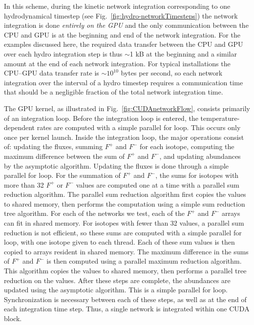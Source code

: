 \documentclass[]{elsart}
\newcommand{\fig}[1]{Fig.~\ref{fig:#1}}
\begin{document}
In this scheme, during the kinetic network integration corresponding to one hydrodynamical
timestep (see \fig{hydro-networkTimesteps}) the network integration is done {\em entirely
on the GPU} and the only communication between the CPU and GPU is at the beginning and end
of the network integration. For the examples discussed here, the required data transfer
between the CPU and GPU over each hydro integration step is thus $\sim$1 kB at the
beginning and a similar amount at the end of each network integration. For typical
installations the CPU--GPU data transfer rate is $\sim 10^{10}$ bytes per
second, so each network integration over the interval of a hydro timestep requires a 
communication time that should be a negligible fraction of the total network
integration time.

The GPU kernel, as illustrated in \fig{CUDAnetworkFlow}, consists primarily of an
integration loop.  Before the integration loop is entered, the temperature-dependent rates
are computed with a simple parallel for loop.  This occurs only once per kernel launch.
Inside the integration loop, the major operations consist of: updating the fluxes,
summing $F^{+}$ and $F^{-}$ for each isotope, computing the maximum difference between
the sum of $F^{+}$ and $F^{-}$, and updating abundances by the asymptotic algorithm.
Updating the fluxes is done through a simple parallel for loop.  For the summation of
$F^{+}$ and $F^{-}$, the sums for isotopes with more than 32 $F^{+}$ or $F^{-}$ values are
computed one at a time with a parallel sum reduction algorithm.  The parallel sum reduction algorithm first
copies the values to shared memory, then performs the computation using
a simple sum reduction tree algorithm.  For each of the networks we test, each of the $F^{+}$
and $F^{-}$ arrays can fit in shared memory.  For isotopes with fewer than 32 values,
a parallel sum reduction is not efficient, so these sums are computed with a simple
parallel for loop, with one isotope given to each thread.  Each of these sum values is
then copied to arrays resident in shared memory.  The maximum difference in the sums of $F^{+}$ and $F^{-}$
is then computed using a parallel maximum reduction algorithm.  This algorithm copies
the values to shared memory, then performs a parallel tree reduction on the values.  After
these steps are complete, the abundances are updated using the asymptotic algorithm.  This
is a simple parallel for loop.  Synchronization is necessary between each of these steps,
as well as at the end of each integration time step.  Thus, a single network is integrated
within one CUDA block.
\end{document}
